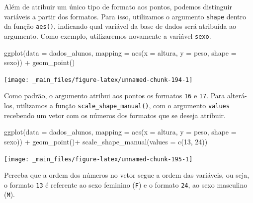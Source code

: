 \documentclass[
  brazilian,
]{book}
\newenvironment{Shaded}{\begin{snugshade}}{\end{snugshade}}
\newcommand{\AttributeTok}[1]{\textcolor[rgb]{0.77,0.63,0.00}{#1}}
\newcommand{\DecValTok}[1]{\textcolor[rgb]{0.00,0.00,0.81}{#1}}
\newcommand{\FunctionTok}[1]{\textcolor[rgb]{0.00,0.00,0.00}{#1}}
\newcommand{\NormalTok}[1]{#1}
\newcommand{\SpecialCharTok}[1]{\textcolor[rgb]{0.00,0.00,0.00}{#1}}
\begin{document}
Além de atribuir um único tipo de formato aos pontos, podemos distinguir variáveis a partir dos formatos. Para isso, utilizamos o argumento \texttt{shape} dentro da função \texttt{aes()}, indicando qual variável da base de dados será atribuída ao argumento. Como exemplo, utilizaremos novamente a variável \texttt{sexo}.

\begin{Shaded}
\begin{Highlighting}[]
\FunctionTok{ggplot}\NormalTok{(}\AttributeTok{data =}\NormalTok{ dados\_alunos,}
       \AttributeTok{mapping =} \FunctionTok{aes}\NormalTok{(}\AttributeTok{x =}\NormalTok{ altura,}
                     \AttributeTok{y =}\NormalTok{ peso,}
                     \AttributeTok{shape =}\NormalTok{ sexo)) }\SpecialCharTok{+}
  \FunctionTok{geom\_point}\NormalTok{()}
\end{Highlighting}
\end{Shaded}

\begin{center}\texttt{[image: \_main\_files/figure-latex/unnamed-chunk-194-1]} \end{center}

Como padrão, o argumento atribui aos pontos os formatos \texttt{16} e \texttt{17}. Para alterá-los, utilizamos a função \texttt{scale\_shape\_manual()}, com o argumento \texttt{values} recebendo um vetor com os números dos formatos que se deseja atribuir.

\begin{Shaded}
\begin{Highlighting}[]
\FunctionTok{ggplot}\NormalTok{(}\AttributeTok{data =}\NormalTok{ dados\_alunos,}
       \AttributeTok{mapping =} \FunctionTok{aes}\NormalTok{(}\AttributeTok{x =}\NormalTok{ altura,}
                     \AttributeTok{y =}\NormalTok{ peso,}
                     \AttributeTok{shape =}\NormalTok{ sexo)) }\SpecialCharTok{+}
  \FunctionTok{geom\_point}\NormalTok{()}\SpecialCharTok{+}
  \FunctionTok{scale\_shape\_manual}\NormalTok{(}\AttributeTok{values =} \FunctionTok{c}\NormalTok{(}\DecValTok{13}\NormalTok{, }\DecValTok{24}\NormalTok{))}
\end{Highlighting}
\end{Shaded}

\begin{center}\texttt{[image: \_main\_files/figure-latex/unnamed-chunk-195-1]} \end{center}

Perceba que a ordem dos números no vetor segue a ordem das variáveis, ou seja, o formato \texttt{13} é referente ao sexo feminino (\texttt{F}) e o formato \texttt{24}, ao sexo masculino (\texttt{M}).
\end{document}
